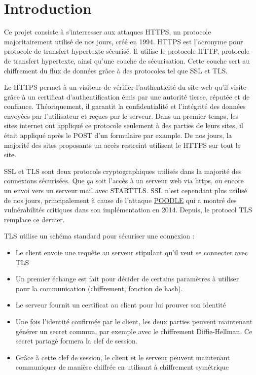 \chapter*{Introduction}

Ce projet consiste à s'interresser aux attaques HTTPS, un protocole majoritairement utilisé de nos jours, créé en 1994. HTTPS est l'acronyme pour protocole de transfert hypertexte sécurisé. Il utilise le protocole HTTP, protocole de transfert hypertexte, ainsi qu'une couche de sécurisation. Cette couche sert au chiffrement du flux de données grâce à des protocoles tel que SSL et TLS.

Le HTTPS permet à un visiteur de vérifier l'authenticité du site web qu'il visite grâce à un certificat d'authentification émis par une autorité tierce, réputée et de confiance. Théoriquement, il garantit la confidentialité et l'intégrité des données envoyées par l'utilisateur et reçues par le serveur. Dans un premier temps, les sites internet ont appliqué ce protocole seulement à des parties de leurs sites, il était appliqué après le POST d'un formulaire par example. De nos jours, la majorité des sites proposants un accès restreint utilisent le HTTPS sur tout le site.

SSL et TLS sont deux protocols cryptographiques utilisés dans la majorité des connexions sécurisées. Que ça soit l'accès à un serveur web via https, ou encore un envoi vers un serveur mail avec STARTTLS. SSL n'est cependant plus utilisé de nos jours, principalement à cause de l'attaque \hyperref[sec:poodle]{POODLE} qui a montré des vulnérabilités critiques dans son implémentation en 2014. Depuis, le protocol TLS remplace ce dernier.

TLS utilise un schéma standard pour sécuriser une connexion :

\begin{itemize}
    \item Le client envoie une requête au serveur stipulant qu'il veut se connecter avec TLS
    \item Un premier échange est fait pour décider de certains paramètres à utiliser pour la communication (chiffrement, fonction de hash).
    \item Le serveur fournit un certificat au client pour lui prouver son identité
    \item Une fois l'identité confirmée par le client, les deux parties peuvent maintenant générer un secret commun, par exemple avec le chiffrement Diffie-Hellman. Ce secret partagé formera la clef de session.
    \item Grâce à cette clef de session, le client et le serveur peuvent maintenant communiquer de manière chiffrée en utilisant à chiffrement symétrique
\end{itemize}

